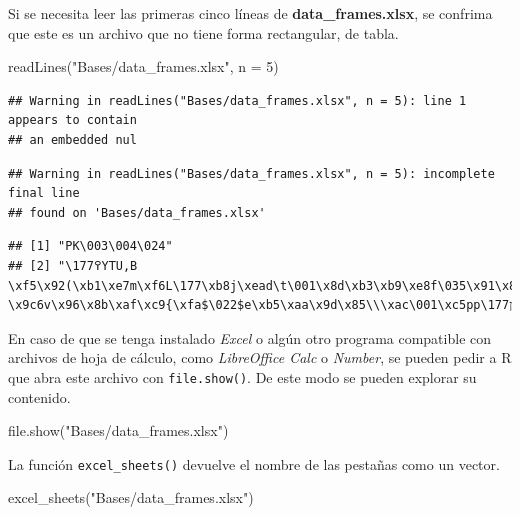 \documentclass[
]{book}
\newenvironment{Shaded}{\begin{snugshade}}{\end{snugshade}}
\newcommand{\AttributeTok}[1]{\textcolor[rgb]{0.77,0.63,0.00}{#1}}
\newcommand{\DecValTok}[1]{\textcolor[rgb]{0.00,0.00,0.81}{#1}}
\newcommand{\FunctionTok}[1]{\textcolor[rgb]{0.00,0.00,0.00}{#1}}
\newcommand{\NormalTok}[1]{#1}
\newcommand{\StringTok}[1]{\textcolor[rgb]{0.31,0.60,0.02}{#1}}
\begin{document}
Si se necesita leer las primeras cinco líneas de \textbf{data\_frames.xlsx}, se confrima que este es un archivo que no tiene forma rectangular, de tabla.

\begin{Shaded}
\begin{Highlighting}[]
\FunctionTok{readLines}\NormalTok{(}\StringTok{"Bases/data\_frames.xlsx"}\NormalTok{, }\AttributeTok{n =} \DecValTok{5}\NormalTok{)}
\end{Highlighting}
\end{Shaded}

\begin{verbatim}
## Warning in readLines("Bases/data_frames.xlsx", n = 5): line 1 appears to contain
## an embedded nul
\end{verbatim}

\begin{verbatim}
## Warning in readLines("Bases/data_frames.xlsx", n = 5): incomplete final line
## found on 'Bases/data_frames.xlsx'
\end{verbatim}

\begin{verbatim}
## [1] "PK\003\004\024"                                                                                                                                                                                                           
## [2] "\177߉YTU,B \xf5\x92(\xb1\xe7m\xf6L\177\xb8j\xead\t\001\x8d\xb3\xb9\xe8f\035\x91\x80-\x9c6v\x96\x8b\xaf\xc9{\xfa$\022$e\xb5\xaa\x9d\x85\\\xac\001\xc5pp\177ן\xac=`\xc2\xd5\026sQ\021\xf9g)\xb1\xa8\xa0Q\x989\017\x96WJ\027"
\end{verbatim}

En caso de que se tenga instalado \emph{Excel} o algún otro programa compatible con archivos de hoja de cálculo, como \emph{LibreOffice Calc} o \emph{Number}, se pueden pedir a R que abra este archivo con \texttt{file.show()}. De este modo se pueden explorar su contenido.

\begin{Shaded}
\begin{Highlighting}[]
\FunctionTok{file.show}\NormalTok{(}\StringTok{"Bases/data\_frames.xlsx"}\NormalTok{)}
\end{Highlighting}
\end{Shaded}

La función \texttt{excel\_sheets()} devuelve el nombre de las pestañas como un vector.

\begin{Shaded}
\begin{Highlighting}[]
\FunctionTok{excel\_sheets}\NormalTok{(}\StringTok{"Bases/data\_frames.xlsx"}\NormalTok{)}
\end{Highlighting}
\end{Shaded}
\end{document}
